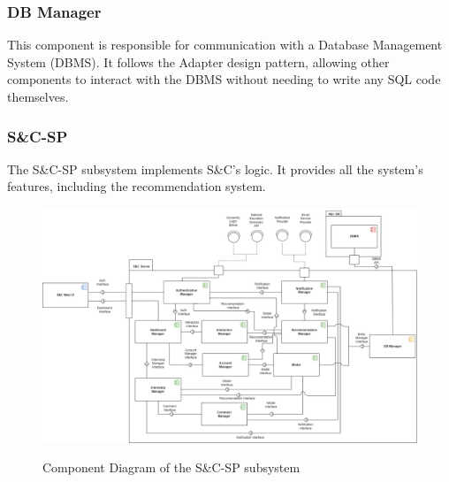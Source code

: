 \documentclass[a4paper,12pt]{article}
\begin{document}
\subsubsection{DB Manager}
This component is responsible for communication with a Database Management System (DBMS).
It follows the Adapter design pattern, allowing other components to interact with the DBMS
without needing to write any SQL code themselves.
\subsubsection{S\&C-SP}
The S\&C-SP subsystem implements S\&C's logic. It provides all the system's features, including the recommendation system.
\begin{figure}%
\centering
\includegraphics[scale=0.50]{DD_figures/ComponentDiagram2-S&C.drawio.png}\\
\caption{Component Diagram of the S\&C-SP subsystem}
\end{figure}
\end{document}
